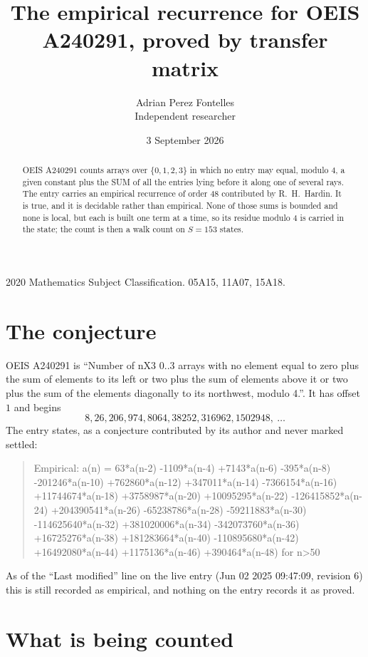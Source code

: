 \documentclass[11pt,a4paper]{article}
\title{The empirical recurrence for OEIS A240291, proved by transfer matrix}
\author{Adrian Perez Fontelles\\ \small Independent researcher}
\date{3 September 2026}
\theoremstyle{plain}
\theoremstyle{definition}
\begin{document}
\maketitle

\begin{abstract}
OEIS A240291 counts arrays over $\{0,1,2,3\}$ in which no entry may equal, modulo $4$, a given
constant plus the SUM of all the entries lying before it along one of several rays. The entry
carries an empirical recurrence of order $48$ contributed by R.~H.~Hardin. It is true, and
it is decidable rather than empirical. None of those sums is bounded and none is local, but
each is built one term at a time, so its residue modulo $4$ is carried in the state; the
count is then a walk count on $S=153$ states.
\end{abstract}

\noindent\small 2020 Mathematics Subject Classification. 05A15, 11A07, 15A18.\normalsize

\section{The conjecture}

OEIS A240291 is ``Number of nX3 0..3 arrays with no element equal to zero plus the sum of elements to its left or two plus the sum of elements above it or two plus the sum of the elements diagonally to its northwest, modulo 4.''. It has offset $1$ and begins
\[
8, 26, 206, 974, 8064, 38252, 316962, 1502948,\ \dots
\]
The entry states, as a conjecture contributed by its author and never marked settled:
\begin{quote}
Empirical: a(n) = 63*a(n-2) -1109*a(n-4) +7143*a(n-6) -395*a(n-8) -201246*a(n-10) +762860*a(n-12) +347011*a(n-14) -7366154*a(n-16) +11744674*a(n-18) +3758987*a(n-20) +10095295*a(n-22) -126415852*a(n-24) +204390541*a(n-26) -65238786*a(n-28) -59211883*a(n-30) -114625640*a(n-32) +381020006*a(n-34) -342073760*a(n-36) +16725276*a(n-38) +181283664*a(n-40) -110895680*a(n-42) +16492080*a(n-44) +1175136*a(n-46) +390464*a(n-48) for n>50
\end{quote}
As of the ``Last modified'' line on the live entry (Jun 02 2025 09:47:09, revision 6) this is still
recorded as empirical, and nothing on the entry records it as proved.

\section{What is being counted}
\end{document}
